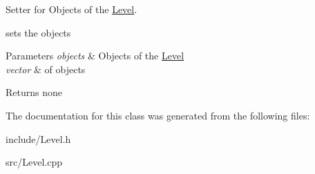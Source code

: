 Setter for Objects of the \hyperlink{classLevel}{Level}. 

sets the objects


\begin{DoxyParams}{Parameters}
{\em objects} & Objects of the \hyperlink{classLevel}{Level}\\
\hline
{\em vector} & of objects \\
\hline
\end{DoxyParams}
\begin{DoxyReturn}{Returns}
none 
\end{DoxyReturn}


The documentation for this class was generated from the following files\+:\begin{DoxyCompactItemize}
\item 
include/Level.\+h\item 
src/Level.\+cpp\end{DoxyCompactItemize}
